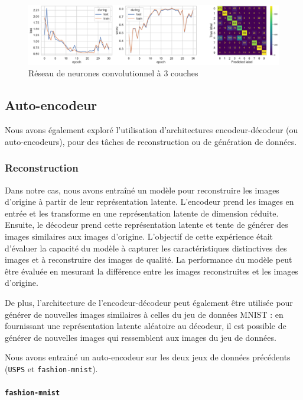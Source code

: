 \documentclass{article}
\begin{document}
\begin{figure}[htbp]
    \centering
    \includegraphics[width=\textwidth]{conv/fashion_conv_3layers_2linear.pdf}
    \caption{Réseau de neurones convolutionnel à 3 couches}
    \label{fig:conv3layers_fashion}
\end{figure}


\subsection{Auto-encodeur}

Nous avons également exploré l'utilisation d'architectures encodeur-décodeur (ou auto-encodeurs), pour des tâches de reconstruction ou de génération de données.

\subsubsection{Reconstruction}

Dans notre cas, nous avons entraîné un modèle pour reconstruire les images d'origine à partir de leur représentation latente. L'encodeur prend les images en entrée et les transforme en une représentation latente de dimension réduite. Ensuite, le décodeur prend cette représentation latente et tente de générer des images similaires aux images d'origine. L'objectif de cette expérience était d'évaluer la capacité du modèle à capturer les caractéristiques distinctives des images et à reconstruire des images de qualité. La performance du modèle peut être évaluée en mesurant la différence entre les images reconstruites et les images d'origine.

De plus, l'architecture de l'encodeur-décodeur peut également être utilisée pour générer de nouvelles images similaires à celles du jeu de données MNIST : en fournissant une représentation latente aléatoire au décodeur, il est possible de générer de nouvelles images qui ressemblent aux images du jeu de données.

Nous avons entrainé un auto-encodeur sur les deux jeux de données précédents (\texttt{USPS} et \texttt{fashion-mnist}). 

\paragraph*{\texttt{fashion-mnist}}
\end{document}
